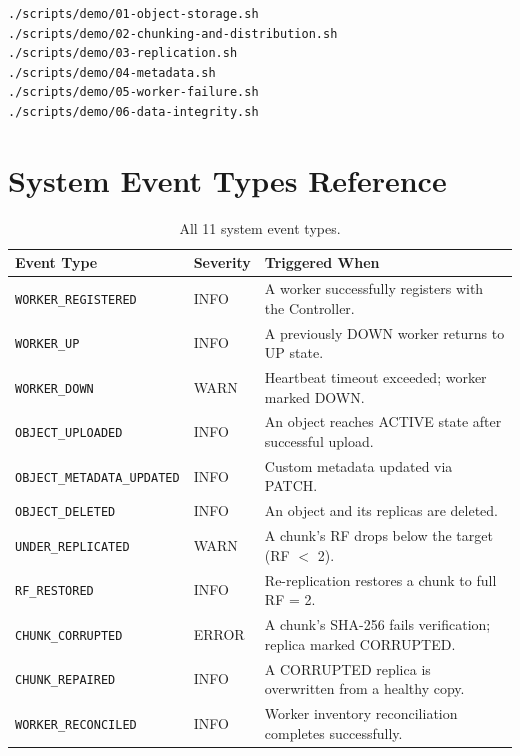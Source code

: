 \documentclass[12pt,a4paper]{report}
\begin{document}
\begin{lstlisting}[style=bashStyle, caption=Run individual demonstration scripts]
./scripts/demo/01-object-storage.sh
./scripts/demo/02-chunking-and-distribution.sh
./scripts/demo/03-replication.sh
./scripts/demo/04-metadata.sh
./scripts/demo/05-worker-failure.sh
./scripts/demo/06-data-integrity.sh
\end{lstlisting}

\chapter{System Event Types Reference}

\begin{table}[H]
  \centering
  \caption{All 11 system event types.}
  \label{tab:events-ref}
  \begin{tabularx}{\textwidth}{llX}
    \toprule
    \textbf{Event Type}        & \textbf{Severity} & \textbf{Triggered When} \\
    \midrule
    \texttt{WORKER\_REGISTERED}      & INFO  & A worker successfully registers with the Controller. \\
    \texttt{WORKER\_UP}              & INFO  & A previously DOWN worker returns to UP state. \\
    \texttt{WORKER\_DOWN}            & WARN  & Heartbeat timeout exceeded; worker marked DOWN. \\
    \texttt{OBJECT\_UPLOADED}        & INFO  & An object reaches ACTIVE state after successful upload. \\
    \texttt{OBJECT\_METADATA\_UPDATED} & INFO & Custom metadata updated via PATCH. \\
    \texttt{OBJECT\_DELETED}         & INFO  & An object and its replicas are deleted. \\
    \texttt{UNDER\_REPLICATED}       & WARN  & A chunk's RF drops below the target (RF $<$ 2). \\
    \texttt{RF\_RESTORED}            & INFO  & Re-replication restores a chunk to full RF = 2. \\
    \texttt{CHUNK\_CORRUPTED}        & ERROR & A chunk's SHA-256 fails verification; replica marked CORRUPTED. \\
    \texttt{CHUNK\_REPAIRED}         & INFO  & A CORRUPTED replica is overwritten from a healthy copy. \\
    \texttt{WORKER\_RECONCILED}      & INFO  & Worker inventory reconciliation completes successfully. \\
    \bottomrule
  \end{tabularx}
\end{table}
\end{document}
